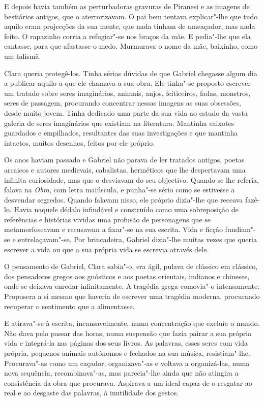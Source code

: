 E depois havia também as perturbadoras gravuras de Piranesi e as imagens
de bestiários antigos, que o aterrorizavam. O pai bem tentava
explicar"-lhe que tudo aquilo eram projecções da sua mente, que nada
tinham de ameaçador, mas nada feito. O rapazinho corria a refugiar"-se
nos braços da mãe. E pedia"-lhe que ela cantasse, para que afastasse o
medo. Murmurava o nome da mãe, baixinho, como um talismã.

Clara queria protegê-los. Tinha sérias dúvidas de que Gabriel chegasse
algum dia a publicar aquilo a que ele chamava a sua obra. Ele tinha"-se
proposto escrever um tratado sobre seres imaginários, animais, anjos,
feiticeiros, fadas, monstros, seres de passagem, procurando concentrar
nessas imagens as suas obsessões, desde muito jovem. Tinha dedicado uma
parte da sua vida ao estudo da vasta galeria de seres imaginários que
existiam na literatura. Mantinha caixotes guardados e empilhados,
resultantes das suas investigações e que mantinha intactos, muitos
desenhos, feitos por ele próprio.

Os anos haviam passado e Gabriel não parava de ler tratados antigos,
poetas arcaicos e autores medievais, cabalistas, herméticos que lhe
despertavam uma infinita curiosidade, mas que o desviavam do seu
objectivo. Quando se lhe referia, falava na \emph{Obra}, com letra
maiúscula, e punha"-se sério como se estivesse a desvendar segredos.
Quando falavam nisso, ele próprio dizia"-lhe que receava fazê-lo. Havia
naquele dédalo infindável e construído como uma sobreposição de
referências e histórias vividas uma profusão de personagens que se
metamorfoseavam e recusavam a fixar"-se na sua escrita. Vida e ficção
fundiam"-se e entrelaçavam"-se. Por brincadeira, Gabriel dizia"-lhe muitas
vezes que queria escrever a vida ou que a sua própria vida se escrevia
através dele.

O pensamento de Gabriel, Clara sabia"-o, era ágil, pulava de clássico em
clássico, dos pensadores gregos aos gnósticos e aos poetas orientais,
indianos e chineses, onde se deixava enredar infinitamente. A tragédia
grega comovia"-o intensamente. Propusera a si mesmo que haveria de
escrever uma tragédia moderna, procurando recuperar o sentimento que a
alimentasse.

E atirava"-se à escrita, incansavelmente, numa concentração que excluía o
mundo. Não dava pelo passar das horas, numa suspensão que fazia pairar a
sua própria vida e integrá-la nas páginas dos seus livros. As palavras,
esses seres com vida própria, pequenos animais autónomos e fechados na
sua música, resistiam"-lhe. Procurava"-as como um caçador, organizava"-as e
voltava a organizá-las, numa nova sequência, recombinava"-as, mas
parecia"-lhe ainda que não atingira a consistência da obra que procurava.
Aspirava a um ideal capaz de o resgatar ao real e ao desgaste das
palavras, à inutilidade dos gestos.

